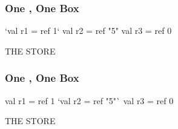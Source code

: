 \documentclass[aspectratio=169, handout]{beamer}
\begin{document}
\begin{frame}[fragile]
  \frametitle{One , One Box}

  \begin{center}
    \begin{minipage}[t][2.5in][t]{0.55\textwidth}
      \vspace{\fill}
      \begin{codeblock}
        `val r1 = ref 1`
        val r2 = ref "5"
        val r3 = ref 0
      \end{codeblock}
      \vspace{\fill}
    \end{minipage}
    \hfill\vline\hfill
    \begin{minipage}[t][2.5in][t]{0.35\textwidth}
      \centering
      {\hspace{-20pt}\color{gray} \large THE STORE}

      \vspace{\fill}
      \vspace{\fill}
    \end{minipage}
  \end{center}
\end{frame}

\begin{frame}[fragile]
  \frametitle{One , One Box}

  \begin{center}
    \begin{minipage}[t][2.5in][t]{0.55\textwidth}
      \vspace{\fill}
      \begin{codeblock}
        val r1 = ref 1
        `val r2 = ref "5"`
        val r3 = ref 0
      \end{codeblock}
      \vspace{\fill}
    \end{minipage}
    \hfill\vline\hfill
    \begin{minipage}[t][2.5in][t]{0.35\textwidth}
      \centering
      {\hspace{-20pt}\color{gray} \large THE STORE}

      \vspace{\fill}
      \vspace{\fill}
    \end{minipage}
  \end{center}
\end{frame}
\end{document}
